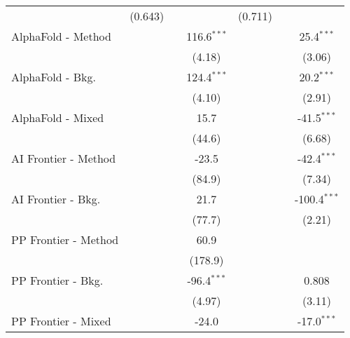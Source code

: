 \begin{tabular}{lcccccc}
                                & (0.643)       &                &                & (0.711)       &               &   \\   
   AlphaFold - Method           &               &                & 116.6$^{***}$  &               &               & 25.4$^{***}$\\   
                                &               &                & (4.18)         &               &               & (3.06)\\   
   AlphaFold - Bkg.             &               &                & 124.4$^{***}$  &               &               & 20.2$^{***}$\\   
                                &               &                & (4.10)         &               &               & (2.91)\\   
   AlphaFold - Mixed            &               &                & 15.7           &               &               & -41.5$^{***}$\\   
                                &               &                & (44.6)         &               &               & (6.68)\\   
   AI Frontier - Method         &               &                & -23.5          &               &               & -42.4$^{***}$\\   
                                &               &                & (84.9)         &               &               & (7.34)\\   
   AI Frontier - Bkg.           &               &                & 21.7           &               &               & -100.4$^{***}$\\   
                                &               &                & (77.7)         &               &               & (2.21)\\   
   PP Frontier - Method         &               &                & 60.9           &               &               &   \\   
                                &               &                & (178.9)        &               &               &   \\   
   PP Frontier - Bkg.           &               &                & -96.4$^{***}$  &               &               & 0.808\\   
                                &               &                & (4.97)         &               &               & (3.11)\\   
   PP Frontier - Mixed          &               &                & -24.0          &               &               & -17.0$^{***}$\\   

\end{tabular}
